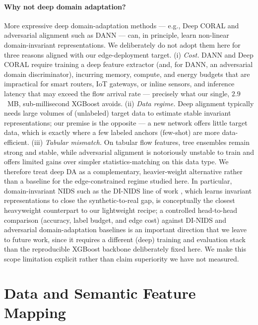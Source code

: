 \documentclass[preprint,12pt,authoryear]{elsarticle}
\begin{document}
\paragraph{Why not deep domain adaptation?} More expressive deep domain-adaptation
methods --- e.g., Deep CORAL and adversarial alignment such as DANN --- can, in
principle, learn non-linear domain-invariant representations. We deliberately do
not adopt them here for three reasons aligned with our edge-deployment target.
(i) \emph{Cost.} DANN and Deep CORAL require training a deep feature extractor
(and, for DANN, an adversarial domain discriminator), incurring memory, compute,
and energy budgets that are impractical for smart routers, IoT gateways, or inline
sensors, and inference latency that may exceed the flow arrival rate --- precisely
what our single, $2.9$~MB, sub-millisecond XGBoost avoids. (ii) \emph{Data regime.}
Deep alignment typically needs large volumes of (unlabeled) target data to
estimate stable invariant representations; our premise is the opposite --- a new
network offers little target data, which is exactly where a few labeled anchors
(few-shot) are more data-efficient. (iii) \emph{Tabular mismatch.} On tabular
flow features, tree ensembles remain strong and stable, while adversarial
alignment is notoriously unstable to train and offers limited gains over simpler
statistics-matching on this data type. We therefore treat deep DA as a
complementary, heavier-weight alternative rather than a baseline for the
edge-constrained regime studied here. In particular, domain-invariant NIDS such as
the DI-NIDS line of work \citep{layeghy}, which learns invariant representations to
close the synthetic-to-real gap, is conceptually the closest heavyweight
counterpart to our lightweight recipe; a controlled head-to-head comparison
(accuracy, label budget, and edge cost) against DI-NIDS and adversarial
domain-adaptation baselines is an important direction that we leave to future work,
since it requires a different (deep) training and evaluation stack than the
reproducible XGBoost backbone deliberately fixed here. We make this scope
limitation explicit rather than claim superiority we have not measured.

\section{Data and Semantic Feature Mapping}
\label{sec:sfm}
\end{document}

